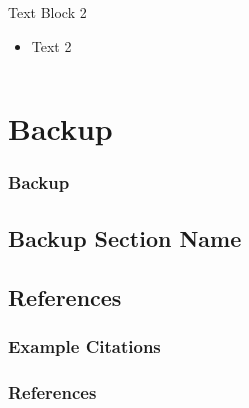 \begin{frame}
\begin{columns}[t]
  \vspace{-0.1in}

  \begin{block}{Text Block 2}
    \begin{itemize}
      \item Text 2
    \end{itemize}
  \end{block}


  \end{columns}




  \end{frame}














\backupbegin

\section*{Backup}

\begin{frame}\frametitle{Backup}
\end{frame}

\subsection*{Backup Section Name}




\subsection*{References}

\begin{frame}\frametitle{Example Citations}
\cite{knacke1968apollo}
\cite{mckinney2013boeing}
\cite{adams2009mars}
\cite{ray2015pendulum}
\cite{ali2017orion}
\cite{anderson2017subscale}

\end{frame}

\begin{frame}[allowframebreaks]\frametitle{References}
\end{frame}


\backupend



